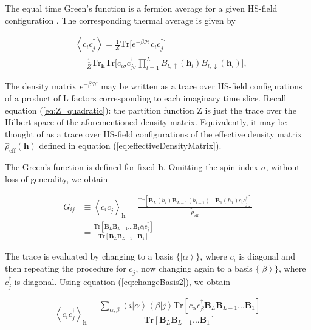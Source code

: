 \documentclass[10pt, twocolumn, twoside]{article}
\begin{document}
The equal time Green's function is a fermion average for a given HS-field configuration \cite{Santos2003}. The corresponding thermal average is given by

\begin{equation}
\begin{split}
&\left\langle c_i c_j^\dagger \right\rangle = \frac{1}{Z} \text{Tr} \bigg[ e^{-\beta \mathcal{H}} c_i c_j^\dagger \bigg] \\
&= \frac{1}{Z} \text{Tr}_{\bm h} \text{Tr} \bigg[ c_{i\sigma} c_{j\sigma}^\dagger \prod_{l=1}^L  B_{l, \uparrow}(\bm h_l) 
B_{l, \downarrow}(\bm h_l) \bigg],
\end{split}
\end{equation}

The density matrix $e^{-\beta\mathcal{H} }$ may be written as a trace over HS-field configurations of a product of L factors corresponding to each imaginary time slice. Recall equation (\ref{eq:Z_quadratic}): the partition function Z is just the trace over the Hilbert space of the aforementioned density matrix. Equivalently, it may be thought of as a trace over HS-field configurations of the effective density matrix $\hat{\rho}_{\text{eff}}(\bm h)$ defined in equation (\ref{eq:effectiveDensityMatrix}).

The Green's function is defined for fixed $\bm h$. Omitting the spin index $\sigma$, without loss of generality, we obtain 

\begin{equation}
\begin{split}
G_{ij}&\equiv \left\langle c_i c_j^\dagger \right\rangle_{\bm h} = \frac{\text{Tr}[\bm B_L(h_l) \bm B_{L-1}(h_{l-1}) ... \bm B_1 (h_1) c_i c_j^\dagger]}{\tilde{\rho}_{\text{eff}}} \\
&= \frac{\text{Tr}[\bm B_L \bm B_{L-1} ... \bm B_1 c_i c_j^\dagger] }{\text{Tr} [\bm B_L \bm B_{L-1} ... \bm B_1] }
\end{split}
\end{equation}

The trace is evaluated by changing to a basis $\{\left|\alpha\right\rangle\}$, where $c_i$ is diagonal and then repeating the procedure for $c_j^\dagger$, now changing again to a basis $\{\left|\beta\right\rangle\}$, where $c_j^\dagger$ is diagonal. Using equation (\ref{eq:changeBasis2}), we obtain

\begin{equation}
\left\langle c_i c_j^\dagger \right\rangle_{\bm h} = \frac{\sum_{\alpha, \beta} \left\langle i | \alpha \right\rangle \left\langle \beta | j \right\rangle \text{Tr}[c_{\alpha} c_\beta^\dagger \bm B_L \bm B_{L-1} ... \bm B_1] }{\text{Tr} [\bm B_L \bm B_{L-1} ... \bm B_1] } 
\end{equation}
\end{document}
